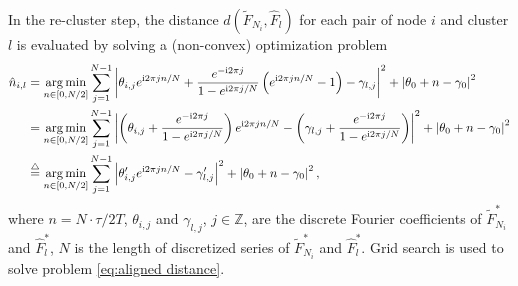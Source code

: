 		In the re-cluster step, the distance $d(\tilde F_{N_i}, \hat F_l)$ for each pair of node $i$ and cluster $l$ is evaluated by solving a (non-convex) optimization problem
		\begin{equation}
		\begin{aligned}\label{eq:aligned distance}
		\hat n_{i,l}&=\underset{n\in[0,N/2]}{\arg\min}\sum_{j=1}^{N-1}
		\left| \theta_{i,j}e^{\complexunit 2\pi j n/N}+
		\frac{e^{-\complexunit{}2\pi j}}{1-e^{\complexunit{}2\pi j /N}}\left( e^{\complexunit{}2\pi j n/N}-1 \right) 
		-\gamma_{l,j} \right|^2
		+ \left| \theta_0+n-\gamma_0 \right|^2
		\\
		&=\underset{n\in[0,N/2]}{\arg\min}\sum_{j=1}^{N-1}
		\left| \left( \theta_{i,j}+ \frac{e^{-\complexunit{}2\pi j}}{1-e^{\complexunit{}2\pi j /N}} \right) e^{\complexunit{}2\pi j n/N} 
		- \left( \gamma_{l,j}+\frac{e^{-\complexunit{}2\pi j}}{1-e^{\complexunit{}2\pi j /N}} \right)  \right|^2 
		+ \left| \theta_0+n-\gamma_0 \right|^2
		\\
		&\overset{\triangle}{=}\underset{n\in[0,N/2]}{\arg\min}\sum_{j=1}^{N-1}\left| \theta_{i,j}' e^{\complexunit{}2\pi j n/N} - {\gamma_{l,j}'}  \right|^2
		+ \left| \theta_0+n-\gamma_0 \right|^2
		,
		\end{aligned}
		\end{equation}
		where $n=N\cdot\tau/2T$,
		$\theta_{i,j}$ and $\gamma_{l,j}$,
		$j\in \mathbb{Z}$, are the discrete Fourier coefficients of $\tilde F^*_{N_i}$ and $\hat F^*_l$,
		$N$ is the length of discretized series of $\tilde F^*_{N_i}$ and $\hat F^*_l$.
		Grid search is used to solve problem \eqref{eq:aligned distance}.

